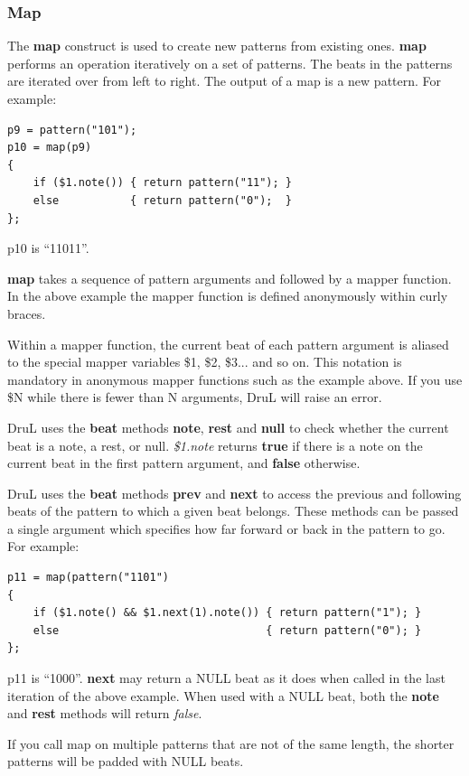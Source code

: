 \subsubsection{Map}\label{MapSection}

The \textbf{map} construct is used to create new patterns from existing ones.
\textbf{map} performs an operation iteratively on a set of patterns.
The beats in the patterns are iterated over from left to right.
The output of a map is a new pattern.  For example:
\begin{verbatim}
p9 = pattern("101");
p10 = map(p9)
{
    if ($1.note()) { return pattern("11"); }
    else           { return pattern("0");  }
};
\end{verbatim}
p10 is ``11011''.

\textbf{map} takes a sequence of pattern arguments and followed by a mapper function.  In the above example the mapper function is defined anonymously within curly braces.

Within a mapper function, the current beat of each pattern argument is aliased to the special mapper variables \$1, \$2, \$3... and so on.  This notation is mandatory in anonymous mapper functions such as the example above. If you use \$N while there is fewer than N arguments, DruL will raise an error.

DruL uses the \textbf{beat} methods \textbf{note}, \textbf{rest} and \textbf{null} to check whether
the current beat is a note, a rest, or null.  
\textit{\$1.note} returns \textbf{true} if there is a note on the current beat in the first pattern argument, and \textbf{false} otherwise.

DruL uses the \textbf{beat} methods \textbf{prev} and \textbf{next} to access the previous and following beats of the pattern to which a given beat belongs. These methods can be passed a single argument which specifies how far forward or back in the pattern to go.  For example:
\begin{verbatim}
p11 = map(pattern("1101")
{
    if ($1.note() && $1.next(1).note()) { return pattern("1"); }
    else                                { return pattern("0"); }
};
\end{verbatim}
p11 is ``1000''.  \textbf{next} may return a NULL beat as it does when called in the last iteration of the above example.  When used with a NULL beat, both the \textbf{note} and \textbf{rest} methods will return \textit{false}.  

If you call map on multiple patterns that are not of the same length, the shorter patterns will be padded with NULL beats.


